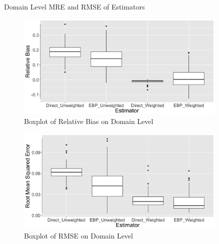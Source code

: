 \documentclass[fleqn,final]{beamer}
\newcommand{\Pheight}{\rule[-5mm]{0cm}{1cm}}
\begin{document}
\begin{frame}
\begin{columns}[t]
\begin{column}{.3\linewidth}
\begin{block}{Domain Level MRE and RMSE of Estimators \Pheight}
\begin{center}
	\begin{figure}
		\includegraphics[width=0.9\textwidth]{BoxPlotMREByDomain}
		\caption{Boxplot of Relative Bias on Domain Level}
	\end{figure}
		\begin{figure}
		\includegraphics[width=0.9\textwidth]{BoxPlotRMSEByDomain}
		\caption{Boxplot of RMSE on Domain Level}
	\end{figure}
\end{center}
\end{block}

\end{column}
\end{columns}

\begin{columns}[t]
%

\begin{column}{.3\linewidth}



\end{column}
\end{columns}
\end{frame}
\end{document}
